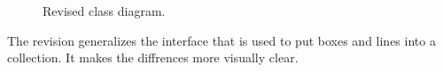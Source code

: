 \begin{figure}
  \centering
  \caption{\label{Figure::lab2uml} Revised class diagram.}
\end{figure}

The revision generalizes the interface that is used to put boxes and lines into a collection. It makes
the diffrences more visually clear.
